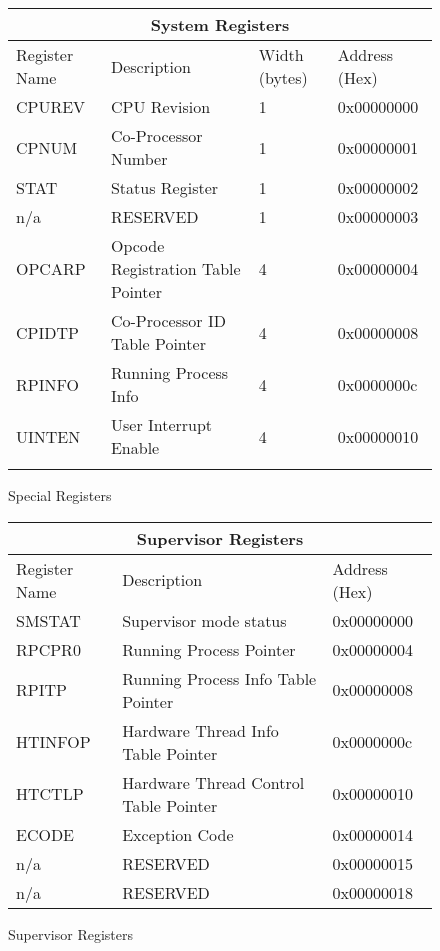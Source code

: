 \documentclass[letterpaper, 11pt]{article}
\begin{document}
\begin{figure}
	
	\caption{Special Registers}
	\begin{center}
		\fontsize{6}{8}\selectfont
		\begin{tabular}{|l|l|l|l|}
			\hline
			\multicolumn{4}{|c|}{System Registers} \\
			\hline
			Register Name 	& Description 				 		& Width (bytes) 	& Address (Hex) \\ \hline
			CPUREV  		& CPU Revision 				 		& 	1				& 0x00000000 	\\ \hline
			CPNUM			& Co-Processor Number		 		&	1				& 0x00000001 	\\ \hline
			STAT			& Status Register			 		&	1				& 0x00000002 	\\ \hline
			n/a				& RESERVED				 	 		&	1				& 0x00000003 	\\ \hline
			OPCARP			& Opcode Registration Table Pointer	&	4				& 0x00000004 	\\ \hline
			CPIDTP 			& Co-Processor ID Table Pointer 	& 	4				& 0x00000008 	\\ \hline
			RPINFO			& Running Process Info				&	4				& 0x0000000c 	\\ \hline
			UINTEN			& User Interrupt Enable				&	4				& 0x00000010	\\ \hlinw

		\end{tabular}
	\end{center}
\end{figure}

\begin{figure}
	\caption{Supervisor Registers}
	
	\begin{center}
		\fontsize{6}{8}\selectfont
		\begin{tabular}{|l|l|l|}
			\hline
			\multicolumn{3}{|c|}{Supervisor Registers} \\
			\hline
			Register Name 	& Description 								& Address (Hex) \\ \hline
			SMSTAT 			& Supervisor mode status 					& 0x00000000 	\\ \hline
			RPCPR0 			& Running Process Pointer 					& 0x00000004	\\ \hline 
			RPITP			& Running Process Info Table Pointer		& 0x00000008	\\ \hline
			HTINFOP			& Hardware Thread Info Table Pointer		& 0x0000000c 	\\ \hline
			HTCTLP 			& Hardware Thread Control Table Pointer		& 0x00000010 	\\ \hline
			ECODE			& Exception Code							& 0x00000014	\\ \hline
			n/a				& RESERVED									& 0x00000015	\\ \hline
			n/a				& RESERVED									& 0x00000018	\\ \hline
		\end{tabular}
	\end{center}
	
\end{figure}
\end{document}
